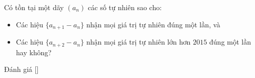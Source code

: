 \ifshowproblem
\begin{problem}\label{problem:RUS-2015-TMO-J-P6}
    Có tồn tại một dãy \( (a_n) \) các số tự nhiên sao cho:
    \begin{itemize}[topsep=0pt, partopsep=0pt, itemsep=0pt]
        \item Các hiệu \( \{a_{n+1} - a_n\} \) nhận mọi giá trị tự nhiên đúng một lần, và
        \item Các hiệu \( \{a_{n+2} - a_n\} \) nhận mọi giá trị tự nhiên lớn hơn \( 2015 \) đúng một lần hay không?
    \end{itemize}
\end{problem}
\fi

\ifshowinfo
Đánh giá [\textbf{}]\footnotemark
{}
\fi